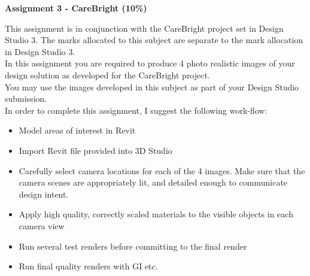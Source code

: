 
	
\begin{flushleft}
\Large\textbf{Assignment 3 - CareBright (10\%)}\\
\end{flushleft}

This assignment is in conjunction with the CareBright project set in Design Studio 3.  The marks allocated to this subject are separate to the mark allocation in Design Studio 3.\\

In this assignment you are required to produce 4 photo realistic images of your design solution as developed for the CareBright project.\\

You may use the images developed in this subject as part of your Design Studio submission.\\

In order to complete this assignment, I suggest the following work-flow:

\begin{itemize}
	\item Model areas of interest in Revit
	\item Import Revit file provided into 3D Studio
	\item Carefully select camera locations for each of the 4 images.  Make sure that the camera scenes are appropriately lit, and detailed enough to communicate design intent.  
	\item Apply high quality, correctly scaled materials to the visible objects in each camera view
	\item Run several test renders before committing to the final render
	\item Run final quality renders with GI etc.
\end{itemize}





